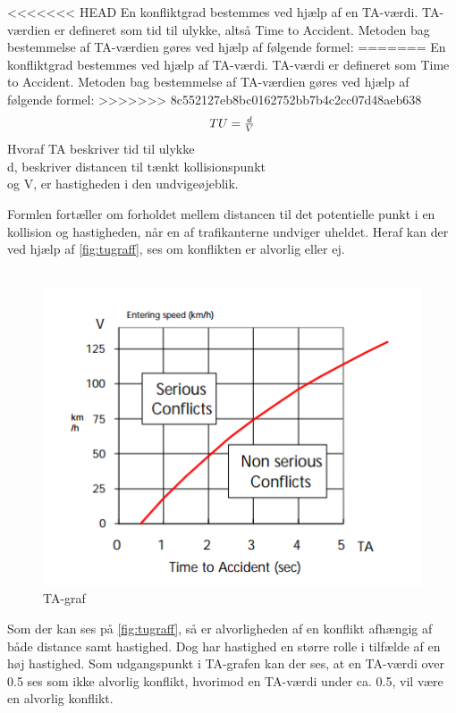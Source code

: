 <<<<<<< HEAD
 En konfliktgrad bestemmes ved hjælp af en TA-værdi. TA-værdien er defineret som tid til ulykke, altså Time to Accident. Metoden bag bestemmelse af TA-værdien gøres ved hjælp af følgende formel:
=======
 En konfliktgrad bestemmes ved hjælp af TA-værdi. TA-værdi er defineret som Time to Accident. Metoden bag bestemmelse af TA-værdien gøres ved hjælp af følgende formel:
>>>>>>> 8c552127eb8bc0162752bb7b4c2cc07d48aeb638
 \begin{equation}
  $$TU=\frac{d}{V} $$
\end{equation}
Hvoraf TA beskriver tid til ulykke \\ d, beskriver distancen til tænkt kollisionspunkt \\ og V, er hastigheden i den undvigeøjeblik.

Formlen fortæller om forholdet mellem distancen til det potentielle punkt i en kollision og hastigheden, når en af trafikanterne undviger uheldet. Heraf kan der ved hjælp af \cref{fig:tugraff}, ses om konflikten er alvorlig eller ej.
~\\\\

\begin{figure}[htbp]
  \label{fig:tagraff}
  \centering
  \begin{adjustbox}{max width=\textwidth}
    \includegraphics{billederogfigur/tugraf.png} %
 \end{adjustbox}
  \caption{TA-graf}
\end{figure}

Som der kan ses på \cref{fig:tugraff}, så er alvorligheden af en konflikt afhængig af både distance samt hastighed. Dog har hastighed en større rolle i tilfælde af en høj hastighed.
Som udgangspunkt i TA-grafen kan der ses, at en TA-værdi over 0.5 ses som ikke alvorlig konflikt, hvorimod en TA-værdi under ca. 0.5, vil være en alvorlig konflikt.




